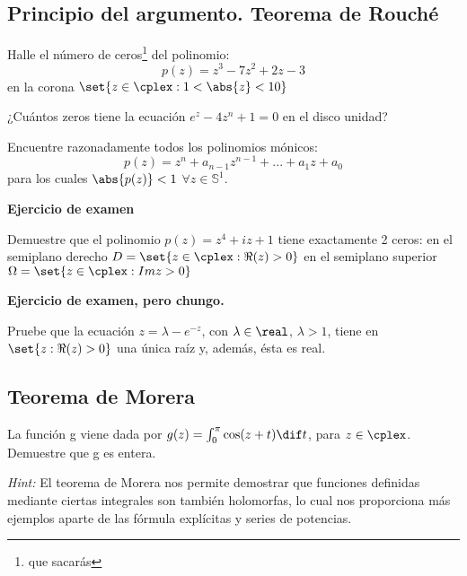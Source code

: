 \subsection{Principio del argumento. Teorema de Rouché}
\begin{problem}
Halle el número de ceros\footnote{que sacarás} del polinomio:
\[ p(z) = z^3 - 7z^2 + 2z - 3 \]
en la corona $\set{z \in \cplex: 1 < \abs{z} < 10 }$
\solution

\end{problem}

\begin{problem}

¿Cuántos zeros tiene la ecuación $e^z - 4 z^n + 1 = 0$ en el disco unidad?
\solution

\end{problem}

\begin{problem}
Encuentre razonadamente todos los polinomios mónicos:
\[ p(z) = z^n + a_{n-1} z^{n-1} + ... + a_1 z + a_0 \]
para los cuales $\abs{p(z)} < 1$ $\forall z \in \mathbb{S}^1$.
\solution

\end{problem}

\begin{problem} {\bf Ejercicio de examen}

Demuestre que el polinomio $p(z) = z^4 + iz + 1$ tiene exactamente 2 ceros:
\ppart en el semiplano derecho $D = \set{z \in \cplex : \Re(z) > 0}$
\ppart en el semiplano superior $\Omega = \set{z \in \cplex : Im z > 0}$
\solution

\end{problem}

\begin{problem} {\bf Ejercicio de examen, pero chungo.}

Pruebe que la ecuación $z = \lambda - e^{-z}$, con $\lambda \in \real$, $\lambda > 1$, tiene en $\set{z : \Re(z) > 0} $ una única raíz y, además, ésta es real.
\solution

\end{problem}

\subsection{Teorema de Morera}
\begin{problem}

La función g viene dada por $g(z) = \int_{0}^{\pi} \cos(z + t) \dif t$, para $z \in \cplex$. Demuestre que g es entera.

{\it Hint:} El teorema de Morera nos permite demostrar que funciones definidas mediante ciertas integrales son también holomorfas, lo cual nos proporciona más ejemplos aparte de las fórmula explícitas y series de potencias.
\solution

\end{problem}

